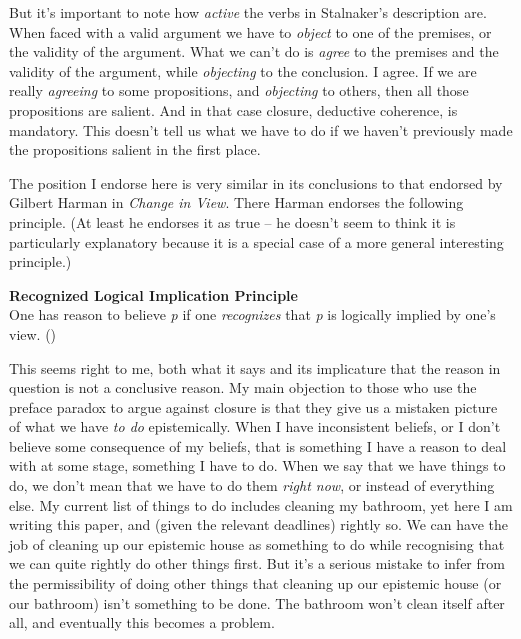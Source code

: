 \documentclass[
  11pt,
  letterpaper,
  DIV=11,
  numbers=noendperiod,
  oneside]{scrartcl}
\begin{document}
But it's important to note how \emph{active} the verbs in Stalnaker's
description are. When faced with a valid argument we have to
\emph{object} to one of the premises, or the validity of the argument.
What we can't do is \emph{agree} to the premises and the validity of the
argument, while \emph{objecting} to the conclusion. I agree. If we are
really \emph{agreeing} to some propositions, and \emph{objecting} to
others, then all those propositions are salient. And in that case
closure, deductive coherence, is mandatory. This doesn't tell us what we
have to do if we haven't previously made the propositions salient in the
first place.

The position I endorse here is very similar in its conclusions to that
endorsed by Gilbert Harman in \emph{Change in View}. There Harman
endorses the following principle. (At least he endorses it as true -- he
doesn't seem to think it is particularly explanatory because it is a
special case of a more general interesting principle.)

\textbf{Recognized Logical Implication Principle}\\
One has reason to believe \emph{p} if one \emph{recognizes} that
\emph{p} is logically implied by one's view.
()

This seems right to me, both what it says and its implicature that the
reason in question is not a conclusive reason. My main objection to
those who use the preface paradox to argue against closure is that they
give us a mistaken picture of what we have \emph{to do} epistemically.
When I have inconsistent beliefs, or I don't believe some consequence of
my beliefs, that is something I have a reason to deal with at some
stage, something I have to do. When we say that we have things to do, we
don't mean that we have to do them \emph{right now}, or instead of
everything else. My current list of things to do includes cleaning my
bathroom, yet here I am writing this paper, and (given the relevant
deadlines) rightly so. We can have the job of cleaning up our epistemic
house as something to do while recognising that we can quite rightly do
other things first. But it's a serious mistake to infer from the
permissibility of doing other things that cleaning up our epistemic
house (or our bathroom) isn't something to be done. The bathroom won't
clean itself after all, and eventually this becomes a problem.
\end{document}

